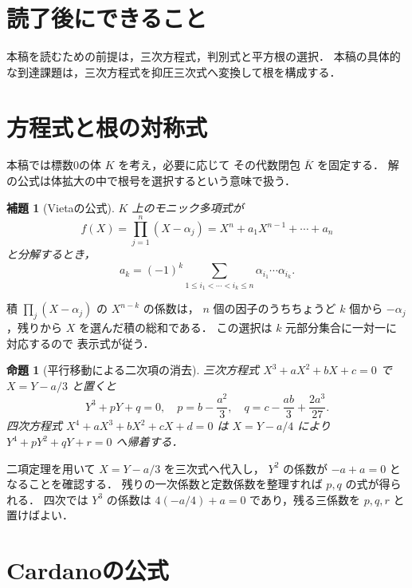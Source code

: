 \documentclass[a5paper,10pt,onecolumn]{jsarticle}
\makeatletter
\theoremstyle{mathnotetheorem}
\newtheorem{lemma}[theorem]{補題}
\newtheorem{proposition}[theorem]{命題}
\renewcommand{\proofname}{証明}
\renewenvironment{proof}[1][\proofname]{%
  \par\pushQED{\qed}\normalfont\topsep4\p@\@plus2\p@\relax
  \trivlist\item[\hskip\labelsep\bfseries #1]\ignorespaces
}{\popQED\endtrivlist\@endpefalse}
\makeatother
\begin{document}
\section*{読了後にできること}
本稿を読むための前提は，三次方程式，判別式と平方根の選択．
本稿の具体的な到達課題は，三次方程式を抑圧三次式へ変換して根を構成する．

\section{方程式と根の対称式}

本稿では標数0の体 $K$ を考え，必要に応じて
その代数閉包 $\overline K$ を固定する．
解の公式は体拡大の中で根号を選択するという意味で扱う．

\begin{lemma}[Vietaの公式]\label{lem:vieta}
$K$ 上のモニック多項式が
\[
 f(X)=\prod_{j=1}^n(X-\alpha_j)
 =X^n+a_1X^{n-1}+\cdots+a_n
\]
と分解するとき，
\[
 a_k=(-1)^k\sum_{1\le i_1<\cdots<i_k\le n}
 \alpha_{i_1}\cdots\alpha_{i_k}.
\]
\end{lemma}
\begin{proof}
積 $\prod_j(X-\alpha_j)$ の $X^{n-k}$ の係数は，
$n$ 個の因子のうちちょうど $k$ 個から
$-\alpha_j$，残りから $X$ を選んだ積の総和である．
この選択は $k$ 元部分集合に一対一に対応するので
表示式が従う．
\end{proof}

\begin{proposition}[平行移動による二次項の消去]
\label{prop:depressed}
三次方程式
$X^3+aX^2+bX+c=0$ で
$X=Y-a/3$ と置くと
\[
 Y^3+pY+q=0,
 \quad p=b-\frac{a^2}3,\quad
 q=c-\frac{ab}3+\frac{2a^3}{27}.
\]
四次方程式
$X^4+aX^3+bX^2+cX+d=0$ は
$X=Y-a/4$ により
$Y^4+pY^2+qY+r=0$ へ帰着する．
\end{proposition}
\begin{proof}
二項定理を用いて $X=Y-a/3$ を三次式へ代入し，
$Y^2$ の係数が $-a+a=0$ となることを確認する．
残りの一次係数と定数係数を整理すれば
$p,q$ の式が得られる．
四次では $Y^3$ の係数は
$4(-a/4)+a=0$ であり，残る三係数を
$p,q,r$ と置けばよい．
\end{proof}

\section{Cardanoの公式}
\end{document}
